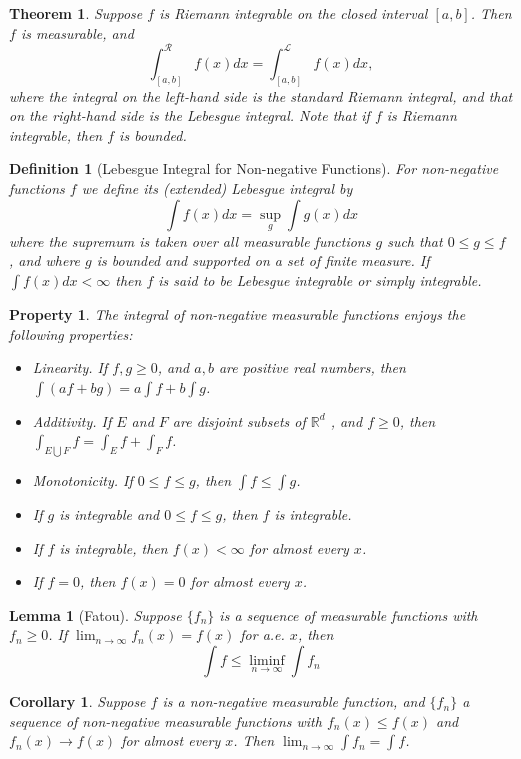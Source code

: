 \documentclass{report}
\theoremstyle{upthm}
\newtheorem{thm}{Theorem}
\newtheorem{defn}{Definition}
\newtheorem{lemma}{Lemma}
\newtheorem{cor}{Corollary}
\newtheorem{property}{Property}
\newcommand{\reals}{\mathbb{R}}
\newcommand{\calL}{{\mathcal{L}}}
\newcommand{\calR}{{\mathcal{R}}}
\newcommand{\set}[1]{\big\lbrace #1 \big\rbrace}
\newcommand{\union}{\bigcup}
\begin{document}
\begin{thm}
	Suppose $f$ is Riemann integrable on the closed interval $[a, b]$. Then $f$ is measurable, and 
	$$ \int_{[a, b]}^\calR f(x) dx  = \int_{[a, b]}^\calL f(x) dx ,$$
	where the integral on the left-hand side is the standard Riemann integral, and that on the right-hand side is the Lebesgue integral. Note that if $f$ is Riemann integrable, then $f$ is bounded.
\end{thm}

\begin{defn}[Lebesgue Integral for Non-negative Functions]
	For non-negative functions $f$ we define its (extended) Lebesgue integral by
	$$\int f(x) dx = \sup_{g} \int g(x) dx$$
	where the supremum is taken over all measurable functions $g$ such that	$0 \leq g \leq f$ , and where $g$ is bounded and supported on a set of finite measure. If $\int f(x) dx < \infty$ then $f$ is said to be Lebesgue integrable or simply integrable.
\end{defn}

\begin{property}
	The integral of non-negative measurable functions enjoys the following properties:
	\begin{itemize}
		\item Linearity. If $f, g \geq 0$, and $a, b$ are positive real numbers, then $\int (a f + b g) = a \int f + b \int g$.
		\item Additivity. If $E$ and $F$ are disjoint subsets of $\reals^d$ , and $f \geq 0$, then $\int_{E \union F} f = \int_E f + \int_F f $.
		\item Monotonicity. If $0 \leq f \leq g$, then $\int f \leq \int g$.
		\item If $g$ is integrable and $0 \leq f \leq g$, then $f$ is integrable.
		\item If $f$ is integrable, then $f (x) < \infty$ for almost every $x$.
		\item If $f = 0$, then $f (x) = 0$ for almost every $x$.
	\end{itemize}
\end{property}

\begin{lemma}[Fatou]
	Suppose $\set{f_n}$ is a sequence of measurable functions with $f_n \geq 0$. If $\lim_{n \rightarrow \infty} f_n (x) = f (x)$ for a.e. $x$, then 
	$$ \int f \leq \liminf_{n \rightarrow \infty} \int f_n $$
\end{lemma}

\begin{cor}
	Suppose $f$ is a non-negative measurable function, and $\set{f_n}$ a sequence of non-negative measurable functions with $f_n (x) \leq f(x)$ and $f_n (x) \rightarrow f (x)$ for almost every $x$. Then $\lim_{n \rightarrow \infty} \int f_n = \int f$.
\end{cor}
\end{document}
